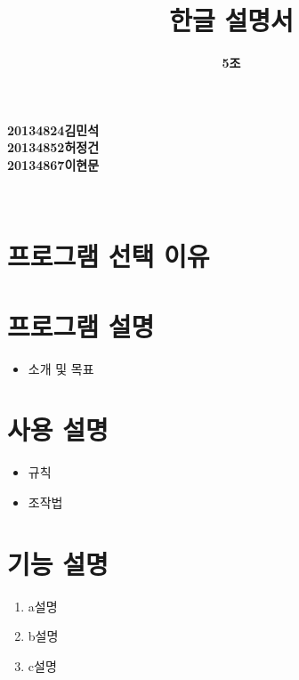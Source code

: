 \documentclass[a4paper, 11pt]{article}
\title{\textbf{\Huge오목 한글 설명서}}
\author{\textbf{\LARGE5조}}
\begin{document}
	
	\maketitle
	
	\vspace{6cm}
	\begin{center}
		\textbf{\large20134824김민석}\\
		\textbf{\large20134852허정건}\\
		\textbf{\large20134867이현문}\\
	\end{center}
	
	
	
	
	\maketitle
	\newpage
	\thispagestyle{empty}        
	\mbox{}
	
	\begin{center} 
		\textbf{}\\
	\end{center}
	\vspace{1cm}
	\section{프로그램 선택 이유}
	\vspace{1cm}
	\section{프로그램 설명}
	\begin{itemize}
		\item 소개 및 목표
	\end{itemize}
	\vspace{0.5cm}
	\section{사용 설명}
		\begin{itemize}
		\item 규칙
		\item 조작법
	\end{itemize}
	\vspace{0.5cm}
	
	\section{기능 설명}
	\begin{enumerate}
		\item a설명
		\item b설명
		\item c설명
	\end{enumerate}
	
\end{document}
